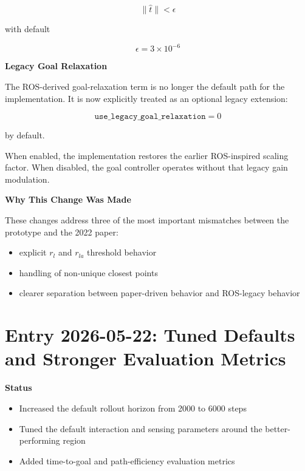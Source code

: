 \documentclass[11pt]{article}
\begin{document}
\begin{equation}
\lVert \hat{t} \rVert < \epsilon
\end{equation}

with default

\begin{equation}
\epsilon = 3 \times 10^{-6}
\end{equation}

\textbf{Legacy Goal Relaxation}

The ROS-derived goal-relaxation term is no longer the default path for the
implementation. It is now explicitly treated as an optional legacy extension:

\begin{equation}
\texttt{use\_legacy\_goal\_relaxation} = 0
\end{equation}

by default.

When enabled, the implementation restores the earlier ROS-inspired scaling
factor. When disabled, the goal controller operates without that legacy gain
modulation.

\textbf{Why This Change Was Made}

These changes address three of the most important mismatches between the
prototype and the 2022 paper:

\begin{itemize}[leftmargin=*]
  \item explicit $r_l$ and $r_{la}$ threshold behavior
  \item handling of non-unique closest points
  \item clearer separation between paper-driven behavior and ROS-legacy behavior
\end{itemize}

\section*{Entry 2026-05-22: Tuned Defaults and Stronger Evaluation Metrics}

\textbf{Status}

\begin{itemize}[leftmargin=*]
  \item Increased the default rollout horizon from 2000 to 6000 steps
  \item Tuned the default interaction and sensing parameters around the better-performing region
  \item Added time-to-goal and path-efficiency evaluation metrics
\end{itemize}
\end{document}
